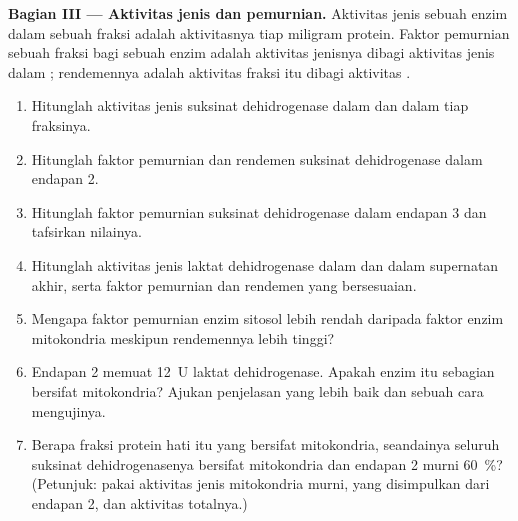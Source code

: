\begin{problem}
\medskip
\noindent\textbf{Bagian III --- Aktivitas jenis dan pemurnian.}
Aktivitas jenis sebuah enzim dalam sebuah fraksi adalah aktivitasnya
tiap miligram protein. Faktor pemurnian sebuah fraksi bagi sebuah enzim
adalah aktivitas jenisnya dibagi aktivitas jenis dalam ;
rendemennya adalah aktivitas fraksi itu dibagi aktivitas .
\begin{enumerate}[resume]
  \item Hitunglah aktivitas jenis suksinat dehidrogenase dalam
         dan dalam tiap fraksinya.
  \item Hitunglah faktor pemurnian dan rendemen suksinat dehidrogenase
        dalam endapan 2.
  \item Hitunglah faktor pemurnian suksinat dehidrogenase dalam
        endapan 3 dan tafsirkan nilainya.
  \item Hitunglah aktivitas jenis laktat dehidrogenase dalam 
        dan dalam supernatan akhir, serta faktor pemurnian dan
        rendemen yang bersesuaian.
  \item Mengapa faktor pemurnian enzim sitosol lebih rendah daripada
        faktor enzim mitokondria meskipun rendemennya lebih tinggi?
  \item Endapan 2 memuat \qty{12}{U} laktat dehidrogenase. Apakah enzim
        itu sebagian bersifat mitokondria? Ajukan penjelasan yang lebih
        baik dan sebuah cara mengujinya.
  \item Berapa fraksi protein hati itu yang bersifat mitokondria,
        seandainya seluruh suksinat dehidrogenasenya bersifat
        mitokondria dan endapan 2 murni \qty{60}{\%}? (Petunjuk: pakai
        aktivitas jenis mitokondria murni, yang disimpulkan dari
        endapan 2, dan aktivitas totalnya.)
\end{enumerate}


\end{problem}
